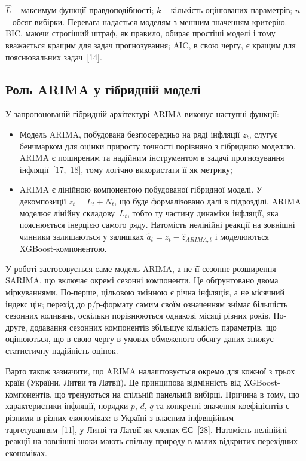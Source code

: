 \documentclass{bachelor_thesis}
\begin{document}
 $\hat{L}$ -- максимум функції правдоподібності; $k$ -- кількість оцінюваних параметрів; $n$ -- обсяг вибірки. Перевага надається моделям з меншим значенням критерію. BIC, маючи строгіший штраф, як правило, обирає простіші моделі і тому вважається кращим для задач прогнозування; AIC, в свою чергу, є кращим для пояснювальних задач~[14].

\subsection{Роль ARIMA у гібридній моделі}

У запропонованій гібридній архітектурі ARIMA виконує наступні функції:

\begin{itemize}
    \item Модель ARIMA, побудована безпосередньо на ряді інфляції $z_t$, слугує бенчмарком для оцінки приросту точності порівняно з гібридною моделлю. ARIMA є поширеним та надійним інструментом в задачі прогнозування інфляції~[17,~18], тому логічно використати її як метрику;
    \item ARIMA є лінійною компонентою побудованої гібридної моделі. У декомпозиції $z_t = L_t + N_t$, що буде формалізовано далі в підрозділі, ARIMA моделює лінійну складову~$L_t$, тобто ту частину динаміки інфляції, яка пояснюється інерцією самого ряду. Натомість нелінійні реакції на зовнішні чинники залишаються у залишках $\hat{a}_t = z_t - \hat{z}_{ARIMA, t}$ і моделюються XGBoost-компонентою.
\end{itemize}

У роботі застосовується саме модель ARIMA, а не її сезонне розширення SARIMA, що включає окремі сезонні компоненти. Це обґрунтовано двома міркуваннями. По-перше, цільовою змінною є річна інфляція, а не місячний індекс цін; перехід до р/р-формату самим своїм означенням знімає більшість сезонних коливань, оскільки порівнюються однакові місяці різних років. По-друге, додавання сезонних компонентів збільшує кількість параметрів, що оцінюються, що в свою чергу в умовах обмеженого обсягу даних знижує статистичну надійність оцінок.

Варто також зазначити, що ARIMA  налаштовується окремо для кожної з трьох країн (України, Литви та Латвії). Це принципова відмінність від XGBoost-компонентів, що тренуються на спільній панельній вибірці. Причина в тому, що характеристики інфляції, порядки $p$, $d$, $q$ та конкретні значення коефіцієнтів є різними в різних економіках: в Україні з власним інфляційним таргетуванням~[11], у Литві та Латвії як членах ЄС~[28]. Натомість нелінійні реакції на зовнішні шоки мають спільну природу в малих відкритих перехідних економіках.
\end{document}
